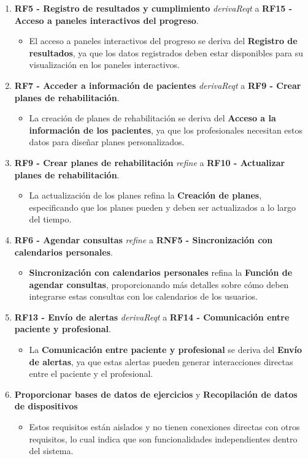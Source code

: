 \documentclass{article}
\begin{document}
\begin{enumerate}
	\item \textbf{RF5 - Registro de resultados y cumplimiento} \textit{derivaReqt} a \textbf{RF15 - Acceso a paneles interactivos del progreso}.
	\begin{itemize}
		\item El acceso a paneles interactivos del progreso se deriva del \textbf{Registro de resultados}, ya que los datos registrados deben estar disponibles para su visualización en los paneles interactivos.
	\end{itemize}
	
	\item \textbf{RF7 - Acceder a información de pacientes} \textit{derivaReqt} a \textbf{RF9 - Crear planes de rehabilitación}.
	\begin{itemize}
		\item La creación de planes de rehabilitación se deriva del \textbf{Acceso a la información de los pacientes}, ya que los profesionales necesitan estos datos para diseñar planes personalizados.
	\end{itemize}
	
	\item \textbf{RF9 - Crear planes de rehabilitación} \textit{refine} a \textbf{RF10 - Actualizar planes de rehabilitación}.
	\begin{itemize}
		\item La actualización de los planes refina la \textbf{Creación de planes}, especificando que los planes pueden y deben ser actualizados a lo largo del tiempo.
	\end{itemize}
	
	\item \textbf{RF6 - Agendar consultas} \textit{refine} a \textbf{RNF5 - Sincronización con calendarios personales}.
	\begin{itemize}
		\item \textbf{Sincronización con calendarios personales} refina la \textbf{Función de agendar consultas}, proporcionando más detalles sobre cómo deben integrarse estas consultas con los calendarios de los usuarios.
	\end{itemize}
	
	\item \textbf{RF13 - Envío de alertas} \textit{derivaReqt} a \textbf{RF14 - Comunicación entre paciente y profesional}.
	\begin{itemize}
		\item La \textbf{Comunicación entre paciente y profesional} se deriva del \textbf{Envío de alertas}, ya que estas alertas pueden generar interacciones directas entre el paciente y el profesional.
	\end{itemize}
	
	\item \textbf{Proporcionar bases de datos de ejercicios} y \textbf{Recopilación de datos de dispositivos}
	\begin{itemize}
		\item Estos requisitos están aislados y no tienen conexiones directas con otros requisitos, lo cual indica que son funcionalidades independientes dentro del sistema.
	\end{itemize}
\end{enumerate}
\end{document}
